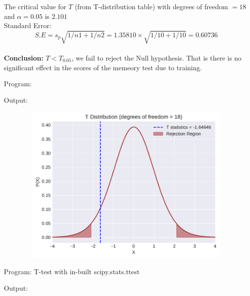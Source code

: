 \documentclass[a4paper,11pt,openright]{report}
\begin{document}
\begin{enumerate}
The critical value for $T$ (from T-distribution table) with degrees of freedom $= 18$ and 
$\alpha = 0.05$ is $2.101$ \\

Standard Error:
\begin{equation*}
S.E = s_{p} \sqrt{1/n1 + 1/n2} = 1.35810 \times \sqrt{1/10 + 1/10} = 0.60736
\end{equation*} \\

\textbf{Conclusion:} $T < T_{0.05}$, we fail to reject the Null hypothesis. That is there is
no significant effect in the scores of the memeory test due to training.

\vspace{3cm}

Program:


\vspace{2cm}

Output:


\begin{figure}[ht!]
\includegraphics[width=16cm,height=8cm,keepaspectratio]{tscript3.pdf}
\centering
\end{figure}

\vspace{2cm}

Program: T-test with in-built scipy.stats.ttest


\vspace{2cm}

Output:



\end{enumerate}
\end{document}
